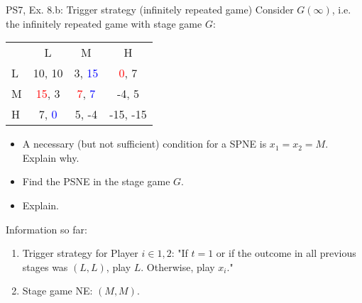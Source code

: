 \begin{frame}{PS7, Ex. 8.b: Trigger strategy (infinitely repeated game)}
    Consider $G(\infty)$, i.e. the infinitely repeated game with stage game $G$: \vspace{-6pt}
    \begin{table}
      \begin{tabular}{l|c|c|c|}
        \multicolumn{1}{c}{} & \multicolumn{1}{c}{L} & \multicolumn{1}{c}{M} & \multicolumn{1}{c}{H} \\\cline{2-4}
        L & 10, 10 & 3, \textcolor{blue}{15} & \textcolor{red}{0}, 7 \\\cline{2-4}
        M & \textcolor{red}{15}, 3 & \textcolor{red}{7}, \textcolor{blue}{7} & -4, 5 \\\cline{2-4}
        H & 7, \textcolor{blue}{0} & 5, -4 & -15, -15 \\\cline{2-4}
      \end{tabular}
    \end{table}
    \begin{itemize}
      \item[(b)] A necessary (but not sufficient) condition for a SPNE is $x_1 = x_2 = M$. Explain why.
    \end{itemize}
  \begin{multicols}{2}
    \begin{itemize}
      \item[(Step a)] Find the PSNE in the stage game $G$.
      \item[(Step b)] Explain.
    \end{itemize}
    \vfill\null\columnbreak
    Information so far:
    \begin{enumerate}
      \item Trigger strategy for Player $i\in1,2$: "If $t=1$ or if the outcome in all previous stages was $(L,L)$, play $L$. Otherwise, play $x_i$."
      \item Stage game NE: $(M,M)$.
    \end{enumerate}
    \vfill\null
  \end{multicols}
\end{frame}

